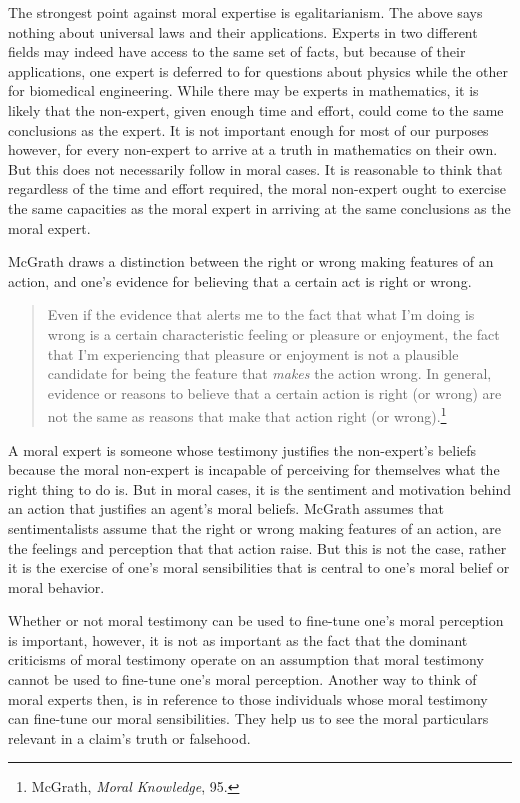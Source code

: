 \documentclass[
  12pt,
]{book}
\theoremstyle{definition}
\theoremstyle{definition}
\theoremstyle{definition}
\theoremstyle{definition}
\theoremstyle{remark}
\begin{document}
The strongest point against moral expertise is egalitarianism. The above says nothing about universal laws and their applications. Experts in two different fields may indeed have access to the same set of facts, but because of their applications, one expert is deferred to for questions about physics while the other for biomedical engineering. While there may be experts in mathematics, it is likely that the non-expert, given enough time and effort, could come to the same conclusions as the expert. It is not important enough for most of our purposes however, for every non-expert to arrive at a truth in mathematics on their own. But this does not necessarily follow in moral cases. It is reasonable to think that regardless of the time and effort required, the moral non-expert ought to exercise the same capacities as the moral expert in arriving at the same conclusions as the moral expert.

McGrath draws a distinction between the right or wrong making features of an action, and one's evidence for believing that a certain act is right or wrong.

\begin{quote}
Even if the evidence that alerts me to the fact that what I'm doing is wrong is a certain characteristic feeling or pleasure or enjoyment, the fact that I'm experiencing that pleasure or enjoyment is not a plausible candidate for being the feature that \emph{makes} the action wrong. In general, evidence or reasons to believe that a certain action is right (or wrong) are not the same as reasons that make that action right (or wrong).\footnote{McGrath, \emph{Moral {Knowledge}}, 95.}
\end{quote}

A moral expert is someone whose testimony justifies the non-expert's beliefs because the moral non-expert is incapable of perceiving for themselves what the right thing to do is. But in moral cases, it is the sentiment and motivation behind an action that justifies an agent's moral beliefs. McGrath assumes that sentimentalists assume that the right or wrong making features of an action, are the feelings and perception that that action raise. But this is not the case, rather it is the exercise of one's moral sensibilities that is central to one's moral belief or moral behavior.

Whether or not moral testimony can be used to fine-tune one's moral perception is important, however, it is not as important as the fact that the dominant criticisms of moral testimony operate on an assumption that moral testimony cannot be used to fine-tune one's moral perception. Another way to think of moral experts then, is in reference to those individuals whose moral testimony can fine-tune our moral sensibilities. They help us to see the moral particulars relevant in a claim's truth or falsehood.
\end{document}
